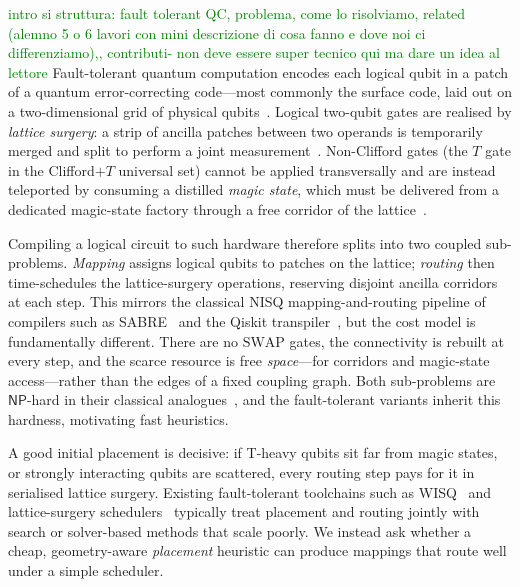 \documentclass[10pt,conference]{IEEEtran}
\theoremstyle{definition}
\theoremstyle{remark}
\newcommand{\SWAP}{\mathrm{SWAP}}
\newcommand{\NP}{\mathsf{NP}}
\begin{document}
\textcolor{green}{intro si struttura: fault tolerant QC, problema,  come lo risolviamo, related (alemno 5 o 6 lavori con mini descrizione di cosa fanno e dove noi ci differenziamo),, contributi- non deve essere super tecnico qui ma dare un idea al lettore}
Fault-tolerant quantum computation encodes each logical qubit in a patch of a
quantum error-correcting code---most commonly the surface code, laid out on a
two-dimensional grid of physical qubits~\cite{fowler2012surface}. Logical
two-qubit gates are realised by \emph{lattice surgery}: a strip of ancilla
patches between two operands is temporarily merged and split to perform a
joint measurement~\cite{horsman2012lattice,litinski2019game}. Non-Clifford
gates (the $T$ gate in the Clifford$+T$ universal set) cannot be applied
transversally and are instead teleported by consuming a distilled \emph{magic
state}, which must be delivered from a dedicated magic-state factory through a
free corridor of the lattice~\cite{bravyi2005magic}.

Compiling a logical circuit to such hardware therefore splits into two coupled
sub-problems. \emph{Mapping} assigns logical qubits to patches on the lattice;
\emph{routing} then time-schedules the lattice-surgery operations, reserving
disjoint ancilla corridors at each step. This mirrors the classical NISQ
mapping-and-routing pipeline of compilers such as SABRE~\cite{li2019sabre} and
the Qiskit transpiler~\cite{qiskit}, but the cost model is fundamentally
different. There are no $\SWAP{}$ gates, the connectivity is rebuilt at every
step, and the scarce resource is free \emph{space}---for corridors and
magic-state access---rather than the edges of a fixed coupling graph. Both sub-problems are
$\NP$-hard in their classical analogues~\cite{siraichi2018qubit}, and the
fault-tolerant variants inherit this hardness, motivating fast heuristics.

A good initial placement is decisive: if T-heavy qubits sit far from magic
states, or strongly interacting qubits are scattered, every routing step pays
for it in serialised lattice surgery. Existing fault-tolerant toolchains such as
WISQ~\cite{wisq} and lattice-surgery schedulers~\cite{beverland2022surface}
typically treat placement and routing jointly with search or solver-based
methods that scale poorly. We instead ask whether a cheap, geometry-aware
\emph{placement} heuristic can produce mappings that route well under a simple
scheduler.
\end{document}
